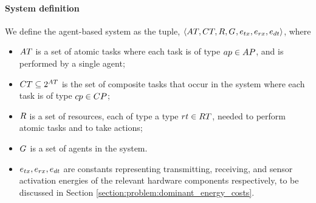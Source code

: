\paragraph{System definition}
\label{section:system_definition}

We define the agent-based system as the tuple, $\langle 
	\setAtomicTask{}{},
	\setCompositeTask{}{},
	\setResource{}{},
	\setAgents{}{},
	\varTransmissionEnergy{}{},
	\varReceiverEnergy{}{},
	\varSensorEnergy{}{}
\rangle$, where
\begin{itemize}
	\item $\setAtomicTask{}{}$ is a set of atomic tasks where each task is of type $\varAtomicTaskType{}{} \in \setAtomicTaskType{}{}$, and is performed by a single agent;
	\item $\setCompositeTask{}{} \subseteq \powerSetSymbol{\setAtomicTask{}{}}{}{}$ is the set of composite tasks that occur in the system where each task is of type $\varCompositeTaskType{}{} \in \setCompositeTaskType{}{}$;
	\item $\setResource{}{}$ is a set of resources, each of type a type $\varResourceType{}{} \in \setResourceType{}{}$, needed to perform atomic tasks and to take actions;
	\item $G_{}^{}$ is a set of agents in the system.
	\item $\varTransmissionEnergy{}{}, \varReceiverEnergy{}{},\varSensorEnergy{}{}$ are constants representing transmitting, receiving, and sensor activation energies of the relevant hardware components respectively, to be discussed in Section \ref{section:problem:dominant_energy_costs}.
\end{itemize}
